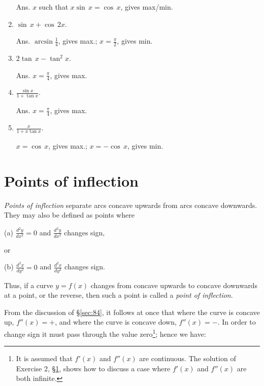 \begin{enumerate}
Ans. $x$ such that $x\sin\, x = \cos\, x$, gives max/min. 

\item
$\sin\,x + \cos\, 2x$. 

Ans. $\arcsin \frac{1}{4}$, gives max.;
 $x = \frac{\pi}{2}$, gives min.

\item
$2\tan\, x - \tan^2x$.

Ans. $ 	x = \frac{\pi}{4}$, gives max.

\item
$\frac{\sin x}{1 + \tan x}$. 

Ans. $	x = \frac{\pi}{4}$, gives max.

\item
$\frac{x}{1 + x \tan x}$. 

$x = \cos\, x$, gives max.;
$x = -\cos\, x$, gives min.

\end{enumerate}


\section{Points of inflection}
\label{sec:85}

\begin{definition}
{\rm 
{\it Points of inflection} separate arcs concave upwards from arcs 
concave downwards. They may also be defined as points where

(a) $\frac{d^2 y}{dx^2} = 0$ and $\frac{d^2 y}{dx^2}$ changes sign,

\noindent
or 

(b) $\frac{d^2 x}{dy^2} = 0$ and $\frac{d^2 x}{dy^2}$ changes sign.
}
\end{definition}

Thus, if a curve $y = f(x)$ changes from concave upwards to concave 
downwards at a point, or the reverse, then such a point 
is called a {\it point of inflection}.

From the discussion of \S \ref{sec:84}, %
it follows at once that where the curve is concave up, $f''(x) = +$, 
and where the curve is concave down, $f''(x) = -$. 
In order to change sign it must pass through the value 
zero\footnote{It is assumed that $f'(x)$ and $f''(x)$ are 
continuous. The solution of Exercise 2, \S \ref{sec:85}, %
shows how to discuss a case where $f'(x)$ and $f''(x)$ are both infinite.};
hence we have:

